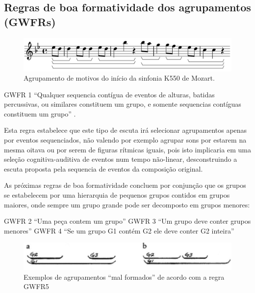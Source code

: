 \documentclass[
	12pt,				%
	openright,			%
	twoside,			%
	a4paper,			%
	english,			%
	french,				%
	spanish,			%
	brazil				%
	]{abntex2}
\begin{document}
\subsection{Regras de boa formatividade dos agrupamentos (GWFRs)}

\begin{figure}[htb]
	\caption{\label{fig_grafico}Agrupamento de motivos do início da sinfonia K550 de Mozart.}
	\begin{center}
	    \includegraphics[scale=0.45]{gttm/lilypondGROUPmozartGTTM.png}
	\end{center}
\end{figure}

\begin{citacao}
GWFR 1 “Qualquer sequencia contígua de eventos de alturas, batidas percussivas, ou similares constituem um grupo, e somente sequencias contíguas constituem um grupo” \cite[ pg.37]{lerdahl1983generative}.
\end{citacao}

Esta regra estabelece que este tipo de escuta irá selecionar agrupamentos apenas por eventos sequenciados, não valendo por exemplo agrupar sons por estarem na mesma oitava ou por serem de figuras rítmicas iguais, pois isto implicaria em uma seleção cognitiva-auditiva de eventos num tempo não-linear, desconstruindo a escuta proposta pela sequencia de eventos da composição original.

As próximas regras de boa formatividade concluem por conjunção que os grupos se estabelecem por uma hierarquia de pequenos grupos contidos em grupos maiores, onde sempre um grupo grande pode ser decomposto em grupos menores:


\begin{citacao}
GWFR 2 “Uma peça contem um grupo”\linebreak
GWFR 3 “Um grupo deve conter grupos menores”\linebreak
GWFR 4  “Se um grupo G1 contém G2 ele deve conter G2 inteira” 
 \cite[ p.38]{lerdahl1983generative}
\end{citacao}


\begin{figure}[htb]
	\caption{\label{fig_grafico}Exemplos de agrupamentos “mal formados” de acordo com a regra GWFR5}
	\begin{center}
	    \includegraphics[scale=0.35]{gttm/GWFR_fig33.png}
	\end{center}
\end{figure}
\end{document}
